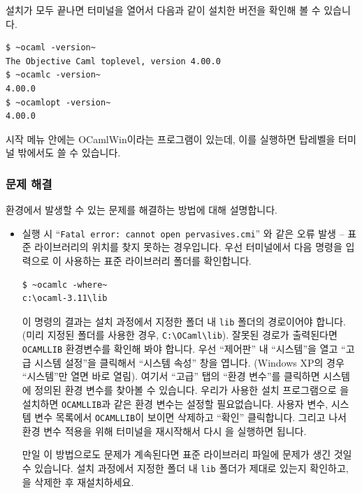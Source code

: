 설치가 모두 끝나면 \CYGWIN{} 터미널을 열어서 다음과 같이 설치한 \OCAML{}
버전을 확인해 볼 수 있습니다.

\begin{lstlisting}
$ ~ocaml -version~
The Objective Caml toplevel, version 4.00.0
$ ~ocamlc -version~
4.00.0
$ ~ocamlopt -version~
4.00.0
\end{lstlisting}

시작 메뉴 안에는 \textsf{OCamlWin}이라는 프로그램이 있는데, 이를 실행하면
\OCAML{} 탑레벨을 터미널 밖에서도 쓸 수 있습니다.

\subsubsection{문제 해결}

\WINDOWS{} 환경에서 발생할 수 있는 \OCAML{} 문제를 해결하는 방법에 대해
설명합니다.

\begin{itemize}
\item \OCAML{} 실행 시 ``\texttt{Fatal error: cannot open pervasives.cmi}'' 와
  같은 오류 발생 -- \OCAML{} 표준 라이브러리의 위치를 찾지 못하는 경우입니다.
  우선 터미널에서 다음 명령을 입력으로 \OCAML{}이 사용하는 표준 라이브러리
  폴더를 확인합니다.

  \begin{lstlisting}
$ ~ocamlc -where~
c:\ocaml-3.11\lib
  \end{lstlisting}

  이 명령의 결과는 설치 과정에서 지정한 폴더 내 \texttt{lib} 폴더의 경로이어야
  합니다. (미리 지정된 폴더를 사용한 경우,
  \texttt{C:\textbackslash{}OCaml\textbackslash{}lib}). 잘못된 경로가
  출력된다면 \texttt{OCAMLLIB} 환경변수를 확인해 봐야 합니다. 우선 ``제어판'' 내
  ``시스템''을 열고 ``고급 시스템 설정''을 클릭해서 ``시스템 속성'' 창을
  엽니다. (\textsf{Windows XP}의 경우 ``시스템''만 열면 바로 열림). 여기서
  ``고급'' 탭의 ``환경 변수''를 클릭하면 시스템에 정의된 환경 변수를 찾아볼 수
  있습니다. 우리가 사용한 설치 프로그램으로 \OCAML{}을 설치하면
  \texttt{OCAMLLIB}과 같은 환경 변수는 설정할 필요없습니다. 사용자 변수,
  시스템 변수 목록에서 \texttt{OCAMLLIB}이 보이면 삭제하고 ``확인''
  클릭합니다. 그리고 나서 환경 변수 적용을 위해 터미널을 재시작해서 다시
  \OCAML{}을 실행하면 됩니다.

  만일 이 방법으로도 문제가 계속된다면 표준 라이브러리 파일에 문제가 생긴 것일 수
  있습니다. 설치 과정에서 지정한 폴더 내 \texttt{lib} 폴더가 제대로 있는지
  확인하고, \OCAML{}을 삭제한 후 재설치하세요.
\end{itemize}

